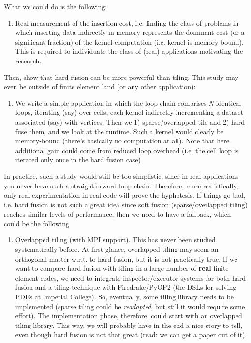 \documentclass[a4paper]{article}
\begin{document}
What we could do is the following:
\begin{enumerate}
 \item Real measurement of the insertion cost, i.e. finding the class of problems in which inserting data indirectly in memory represents the dominant cost  (or a significant fraction) of the kernel computation (i.e. kernel is memory bound). This is required to individuate the class of (real) applications motivating the research.
 \setcounter{enumTemp}{\theenumi}
 \end{enumerate} 
 Then, show that hard fusion can be more powerful than tiling. This study may even be outside of finite element land (or any other application):
 \begin{enumerate}
  \setcounter{enumi}{\theenumTemp}
 \item We write a simple application in which the loop chain comprises \emph{N} identical loops, iterating (say) over cells, each kernel indirectly incrementing a dataset associated (say) with vertices. Then we 1) sparse/overlapped tile and 2) hard fuse them, and we look at the runtime. Such a kernel would clearly be memory-bound (there's basically no computation at all). Note that here additional gain could come from reduced loop overhead (i.e. the cell loop is iterated only once in the hard fusion case)
  \setcounter{enumTemp}{\theenumi}
 \end{enumerate}
In practice, such a study would still be too simplistic, since in real applications you never have such a straightforward loop chain. Therefore, more realistically, only real experimentation in real code will prove the hyphotesis. If things go bad, i.e. hard fusion is not such a great idea since soft fusion (sparse/overlapped tiling) reaches similar levels of performance, then we need to have a fallback, which could be the following
\begin{enumerate}
  \setcounter{enumi}{\theenumTemp}
\item Overlapped tiling (with MPI support). This has never been studied systematically before. At first glance, overlapped tiling may seem an orthogonal matter w.r.t. to hard fusion, but it is not practically true. If we want to compare hard fusion with tiling in a large number of \textbf{real} finite element codes, we need to integrate inspector/executor systems for both hard fusion and a tiling technique with Firedrake/PyOP2 (the DSLs for solving PDEs at Imperial College). So, eventually, some tiling library needs to be implemented (sparse tiling could be \textit{readapted}, but still it would require some effort). The implementation phase, therefore, could start with an overlapped tiling library. This way, we will probably have in the end a nice story to tell, even though hard fusion is not that great (read: we can get a paper out of it).
\end{enumerate}
\end{document}

